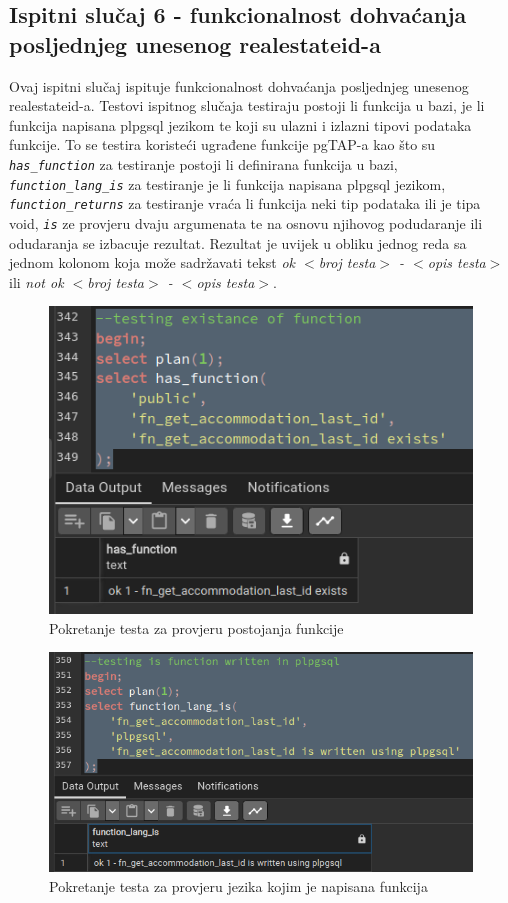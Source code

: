 				\subsection{Ispitni slučaj 6 - funkcionalnost dohvaćanja posljednjeg unesenog realestateid-a}
				Ovaj ispitni slučaj ispituje funkcionalnost dohvaćanja posljednjeg unesenog realestateid-a. Testovi ispitnog slučaja testiraju postoji li funkcija u bazi, je li funkcija napisana plpgsql jezikom te koji su ulazni i izlazni tipovi podataka funkcije. To se testira koristeći ugrađene funkcije pgTAP-a kao što su \textit{\texttt{has\_function}} za testiranje postoji li definirana funkcija u bazi, \textit{\texttt{function\_lang\_is}} za testiranje je li funkcija napisana plpgsql jezikom, \textit{\texttt{function\_returns}} za testiranje vraća li funkcija neki tip podataka ili je tipa void, \textit{\texttt{is\(\)}} ze provjeru dvaju argumenata te na osnovu njihovog podudaranje ili odudaranja se izbacuje rezultat. Rezultat je uvijek u obliku jednog reda sa jednom kolonom koja može sadržavati tekst \textit{ok $<$broj testa$>$ - $<$opis testa$>$} ili \textit{not ok $<$broj testa$>$ - $<$opis testa$>$}.
				\begin{figure}[H]
					\centering
					\includegraphics[width=\textwidth]{slike/unit_tests/ut_6/has_func.png}
					\caption{Pokretanje testa za provjeru postojanja funkcije}
					\label{fig: IS6-has_function}
				\end{figure}
				\begin{figure}[H]
					\centering
					\includegraphics[width=\textwidth]{slike/unit_tests/ut_6/func_lang.png}
					\caption{Pokretanje testa za provjeru jezika kojim je napisana funkcija}
					\label{fig: IS6-function_lang}
				\end{figure}

